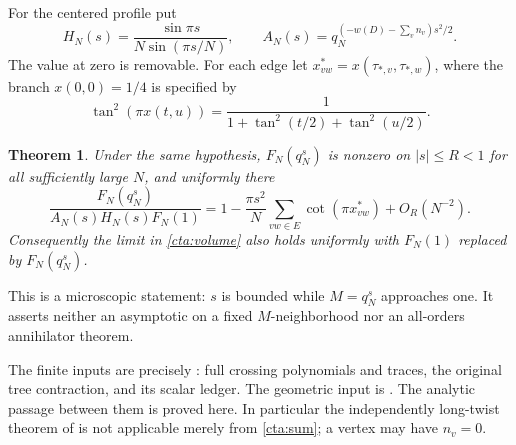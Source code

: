 \documentclass[11pt]{article}
\numberwithin{equation}{section}
\newtheorem{theorem}{Theorem}[section]
\theoremstyle{definition}\newtheorem{definition}[theorem]{Definition}
\theoremstyle{remark}\newtheorem{remark}[theorem]{Remark}
\begin{document}
For the centered profile put
\[
 H_N(s)=\frac{\sin\pi s}{N\sin(\pi s/N)},\qquad
 A_N(s)=q_N^{(-w(D)-\sum_vn_v)s^2/2}.
\]
The value at zero is removable. For each edge let
\(x_{vw}^*=x(\tau_{*,v},\tau_{*,w})\), where the branch \(x(0,0)=1/4\)
is specified by
\begin{equation}\label{cta:wire}
 \tan^2(\pi x(t,u))
     =\frac1{1+\tan^2(t/2)+\tan^2(u/2)}.
\end{equation}

\begin{theorem}\label{cta:profile}
Under the same hypothesis, \(F_N(q_N^s)\) is nonzero on
\(|s|\le R<1\) for all sufficiently large \(N\), and uniformly there
\begin{equation}\label{cta:profile-formula}
 \frac{F_N(q_N^s)}{A_N(s)H_N(s)F_N(1)}
 =1-\frac{\pi s^2}{N}\sum_{vw\in E}\cot(\pi x_{vw}^*)
                                      +O_R(N^{-2}).
\end{equation}
Consequently the limit in \eqref{cta:volume} also holds uniformly
with \(F_N(1)\) replaced by \(F_N(q_N^s)\).
\end{theorem}

This is a microscopic statement: \(s\) is bounded while \(M=q_N^s\)
approaches one. It asserts neither an asymptotic on a fixed
\(M\)-neighborhood nor an all-orders annihilator theorem.

The finite inputs are precisely \cite[Proposition~6.1, Theorem~7.1
and Proposition~8.1]{Meridian}: full crossing polynomials and traces,
the original tree contraction, and its scalar ledger. The geometric
input is \cite[Theorem~1.1]{Geometry}. The analytic passage between
them is proved here. In particular the independently long-twist
theorem of \cite{Oscillatory} is not applicable merely from
\eqref{cta:sum}; a vertex may have \(n_v=0\).





\end{document}
